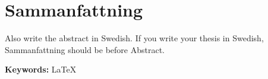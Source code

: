 \section*{Sammanfattning}\label{sec:sammanfattning}
Also write the abstract in Swedish. If you write your thesis in Swedish, Sammanfattning should be
before Abstract. %

\textbf{Keywords:} LaTeX 
